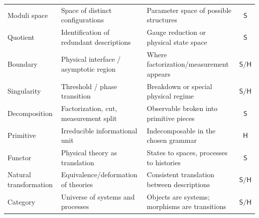 \documentclass[12pt]{article}
\theoremstyle{definition}
\theoremstyle{remark}
\newcommand{\Sstat}{\mathsf{S}}
\newcommand{\Hstat}{\mathsf{H}}
\begin{document}
\begin{longtable}{@{}>{\raggedright\arraybackslash}p{3.5cm}>{\raggedright\arraybackslash}p{4.5cm}>{\raggedright\arraybackslash}p{4.8cm}c@{}}
Moduli space & Space of distinct configurations & Parameter space of possible structures & $\Sstat$ \\
Quotient & Identification of redundant descriptions & Gauge reduction or physical state space & $\Sstat$ \\
Boundary & Physical interface / asymptotic region & Where factorization/measurement appears & $\Sstat/\Hstat$ \\
Singularity & Threshold / phase transition & Breakdown or special physical regime & $\Sstat/\Hstat$ \\
Decomposition & Factorization, cut, measurement split & Observable broken into primitive pieces & $\Sstat$ \\
Primitive & Irreducible informational unit & Indecomposable in the chosen grammar & $\Hstat$ \\
Functor & Physical theory as translation & States to spaces, processes to histories & $\Sstat$ \\
Natural transformation & Equivalence/deformation of theories & Consistent translation between descriptions & $\Sstat/\Hstat$ \\
Category & Universe of systems and processes & Objects are systems; morphisms are transitions & $\Sstat/\Hstat$ \\
\end{longtable}
\end{document}
